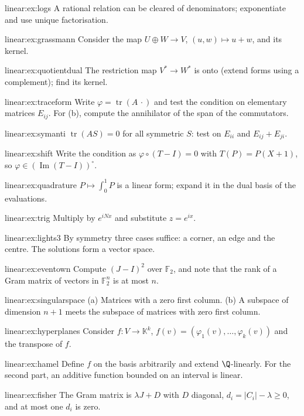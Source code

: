\begin{hint}{linear:ex:logs}
A rational relation can be cleared of denominators; exponentiate and use unique factorisation.
\end{hint}
\begin{hint}{linear:ex:grassmann}
Consider the map $U\oplus W\to V$, $(u,w)\mapsto u+w$, and its kernel.
\end{hint}
\begin{hint}{linear:ex:quotientdual}
The restriction map $V^*\to W^*$ is onto (extend forms using a complement); find its kernel.
\end{hint}
\begin{hint}{linear:ex:traceform}
Write $\varphi=\operatorname{tr}(A\,\cdot)$ and test the condition on elementary matrices $E_{ij}$. For (b), compute the
annihilator of the span of the commutators.
\end{hint}
\begin{hint}{linear:ex:symanti}
$\operatorname{tr}(AS)=0$ for all symmetric $S$: test on $E_{ii}$ and $E_{ij}+E_{ji}$.
\end{hint}
\begin{hint}{linear:ex:shift}
Write the condition as $\varphi\circ(T-I)=0$ with $T(P)=P(X+1)$, so $\varphi\in(\operatorname{Im}(T-I))^\circ$.
\end{hint}
\begin{hint}{linear:ex:quadrature}
$P\mapsto\int_0^1P$ is a linear form; expand it in the dual basis of the evaluations.
\end{hint}
\begin{hint}{linear:ex:trig}
Multiply by $e^{iNx}$ and substitute $z=e^{ix}$.
\end{hint}
\begin{hint}{linear:ex:lights3}
By symmetry three cases suffice: a corner, an edge and the centre. The solutions form a vector space.
\end{hint}
\begin{hint}{linear:ex:eventown}
Compute $(J-I)^2$ over $\mathbb F_2$, and note that the rank of a Gram matrix of vectors in $\mathbb F_2^n$ is at most $n$.
\end{hint}
\begin{hint}{linear:ex:singularspace}
(a) Matrices with a zero first column. (b) A subspace of dimension $n+1$ meets the subspace of matrices with zero first
column.
\end{hint}
\begin{hint}{linear:ex:hyperplanes}
Consider $f:V\to\mathbb K^k$, $f(v)=(\varphi_1(v),\dots,\varphi_k(v))$ and the transpose of $f$.
\end{hint}
\begin{hint}{linear:ex:hamel}
Define $f$ on the basis arbitrarily and extend $\Q$-linearly. For the second part, an additive function bounded on an
interval is linear.
\end{hint}
\begin{hint}{linear:ex:fisher}
The Gram matrix is $\lambda J+D$ with $D$ diagonal, $d_i=|C_i|-\lambda\ge0$, and at most one $d_i$ is zero.
\end{hint}

